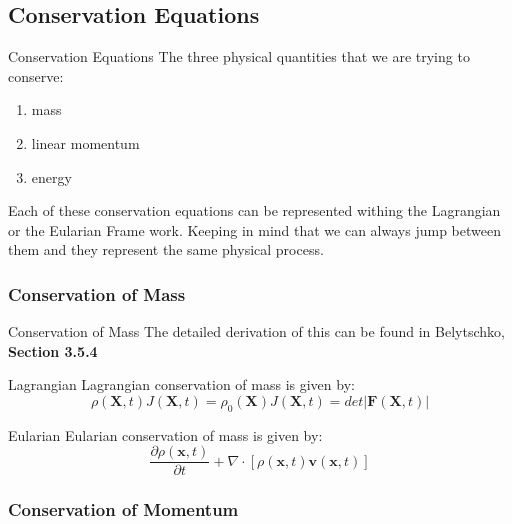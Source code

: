 \documentclass{beamer}
\begin{document}
\subsection{Conservation Equations}
\begin{frame}{Conservation Equations}
	The three physical quantities that we are trying to conserve:
	\begin{enumerate}
		\item mass
		\item linear momentum
		\item energy
	\end{enumerate}
\vskip 1cm
	Each of these conservation equations can be represented withing the Lagrangian or the Eularian Frame 	work. Keeping in mind that we can always jump between them and they represent the same physical process.
\end{frame}

\subsubsection{Conservation of Mass}
\begin{frame}{Conservation of Mass}
The detailed derivation of this can be found in Belytschko, \textbf{Section 3.5.4}
	\begin{block}{Lagrangian}
		Lagrangian conservation of mass is given by:
		\begin{subequations}
			\begin{equation}
				\rho(\mathbf{X},t)J(\mathbf{X},t)=\rho_{0}(\mathbf{X})
			\end{equation}
			\begin{equation}
				J(\mathbf{X},t)=det|\mathbf{F}(\mathbf{X},t)|
			\end{equation}
		\end{subequations}
	\end{block}
\begin{block}{Eularian}
	Eularian conservation of mass is given by:
	\begin{equation}
		\frac{\partial \rho(\mathbf{x},t)}{\partial t}+\nabla\cdot[\rho(\mathbf{x},t)\mathbf{v}						(\mathbf{x},t)]
	\end{equation}
\end{block}
\end{frame}

\subsubsection{Conservation of Momentum}
\end{document}
